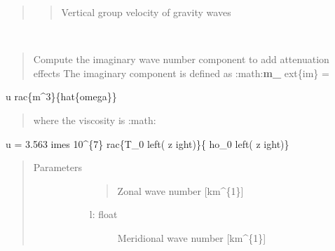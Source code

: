 \documentclass[letterpaper,10pt,english]{sphinxmanual}
\begin{document}
\begin{fulllineitems}
\begin{quote}
\begin{description}
\begin{description}
\begin{quote}
\sphinxAtStartPar
Vertical group velocity of gravity waves
\end{quote}

\end{description}

\end{description}\end{quote}

\end{fulllineitems}


\begin{fulllineitems}
\label{\detokenize{stochprop.gravity:stochprop.gravity_waves.m_imag}}~\begin{quote}

\sphinxAtStartPar
Compute the imaginary wave number component to add attenuation effects
The imaginary component is defined as :math:{\color{red}\bfseries{}\textasciigrave{}}{\color{red}\bfseries{}m\_} ext\{im\} = \sphinxhyphen{}
\end{quote}

\sphinxAtStartPar
u 
rac\{m\textasciicircum{}3\}\{hat\{omega\}\}\textasciigrave{}
\begin{quote}

\sphinxAtStartPar
where the viscosity is :math:{\color{red}\bfseries{}\textasciigrave{}}
\end{quote}

\sphinxAtStartPar
u = 3.563       imes 10\textasciicircum{}\{\sphinxhyphen{}7\} 
rac\{T\_0 left( z 
ight)\}\{
ho\_0 left( z 
ight)\}\textasciigrave{}
\begin{quote}\begin{description}
\item[{Parameters}] \leavevmode\begin{description}
\item[{}] \leavevmode\begin{quote}

\sphinxAtStartPar
Zonal wave number {[}km\textasciicircum{}\{\sphinxhyphen{}1\}{]}
\end{quote}
\begin{description}
\item[{l: float}] \leavevmode
\sphinxAtStartPar
Meridional wave number {[}km\textasciicircum{}\{\sphinxhyphen{}1\}{]}


\end{description}
\end{description}
\end{description}
\end{quote}
\end{fulllineitems}
\end{document}
